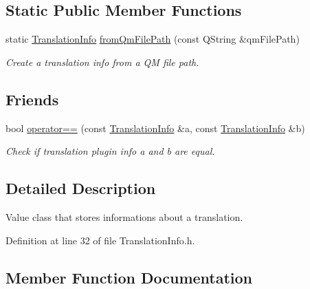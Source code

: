 \subsection*{Static Public Member Functions}
\begin{DoxyCompactItemize}
\item 
static \hyperlink{class_mdt_1_1_translation_1_1_translation_info}{Translation\+Info} \hyperlink{class_mdt_1_1_translation_1_1_translation_info_a2b7742d918f9b1c67f27c2a4dbe61528}{from\+Qm\+File\+Path} (const Q\+String \&qm\+File\+Path)
\begin{DoxyCompactList}\small\item\em Create a translation info from a QM file path. \end{DoxyCompactList}\end{DoxyCompactItemize}
\subsection*{Friends}
\begin{DoxyCompactItemize}
\item 
bool \hyperlink{class_mdt_1_1_translation_1_1_translation_info_add361867983af82858b69ac555f26d2c}{operator==} (const \hyperlink{class_mdt_1_1_translation_1_1_translation_info}{Translation\+Info} \&a, const \hyperlink{class_mdt_1_1_translation_1_1_translation_info}{Translation\+Info} \&b)\hypertarget{class_mdt_1_1_translation_1_1_translation_info_add361867983af82858b69ac555f26d2c}{}\label{class_mdt_1_1_translation_1_1_translation_info_add361867983af82858b69ac555f26d2c}

\begin{DoxyCompactList}\small\item\em Check if translation plugin info a and b are equal. \end{DoxyCompactList}\end{DoxyCompactItemize}


\subsection{Detailed Description}
Value class that stores informations about a translation. 

Definition at line 32 of file Translation\+Info.\+h.



\subsection{Member Function Documentation}
